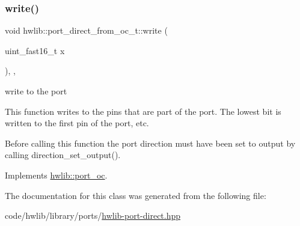 \subsubsection{\texorpdfstring{write()}{write()}}
{\footnotesize\ttfamily void hwlib\+::port\+\_\+direct\+\_\+from\+\_\+oc\+\_\+t\+::write (\begin{DoxyParamCaption}\item[{uint\+\_\+fast16\+\_\+t}]{x }\end{DoxyParamCaption})\hspace{0.3cm}{\ttfamily [inline]}, {\ttfamily [override]}, {\ttfamily [virtual]}}





write to the port

This function writes to the pins that are part of the port. The lowest bit is written to the first pin of the port, etc.

Before calling this function the port direction must have been set to output by calling direction\+\_\+set\+\_\+output(). 

Implements \hyperlink{classhwlib_1_1port__oc_aa5889aedda709f045730db9859e4fcf4}{hwlib\+::port\+\_\+oc}.



The documentation for this class was generated from the following file\+:\begin{DoxyCompactItemize}
\item 
code/hwlib/library/ports/\hyperlink{hwlib-port-direct_8hpp}{hwlib-\/port-\/direct.\+hpp}\end{DoxyCompactItemize}
